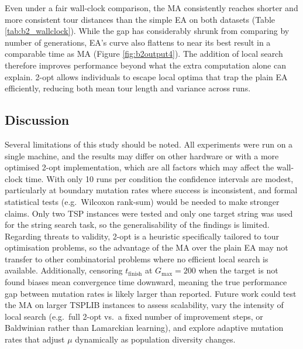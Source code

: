 \documentclass{article}
\begin{document}
Even under a fair wall-clock comparison, the MA consistently reaches shorter and more consistent tour distances than the simple EA on both datasets (Table \ref{tab:b2_wallclock}). While the gap has considerably shrunk from comparing by number of generations, EA's curve also flattens to near its best result in a comparable time as MA (Figure \ref{fig:b2output4}). The addition of local search therefore improves performance beyond what the extra computation alone can explain. 2-opt allows individuals to escape local optima that trap the plain EA efficiently, reducing both mean tour length and variance across runs.



\subsection*{Discussion}

Several limitations of this study should be noted. All experiments were run on a single machine, and the results may differ on other 
hardware or with a more optimised 2-opt implementation, which are all factors which may affect the wall-clock time. With only 10 runs 
per condition the confidence intervals are modest, particularly at boundary mutation rates where success is inconsistent, and formal statistical tests (e.g.\ Wilcoxon rank-sum) would be needed to make stronger claims. 
Only two TSP instances were tested and only one target string was used for the string search task, so the generalisability of the findings is 
limited. Regarding threats to validity, 2-opt is a heuristic specifically tailored to tour optimisation problems, so the advantage of the 
MA over the plain EA may not transfer to other combinatorial problems where no efficient local search is available. Additionally, censoring 
$t_{\text{finish}}$ at $G_{\max} = 200$ when the target is not found biases mean convergence time downward, meaning the true performance gap 
between mutation rates is likely larger than reported. Future work could test the MA on larger TSPLIB instances to assess scalability, vary 
the intensity of local search (e.g.\ full 2-opt vs.\ a fixed number of improvement steps, or Baldwinian rather than Lamarckian learning), 
and explore adaptive mutation rates that adjust $\mu$ dynamically as population diversity changes.

\end{document}
